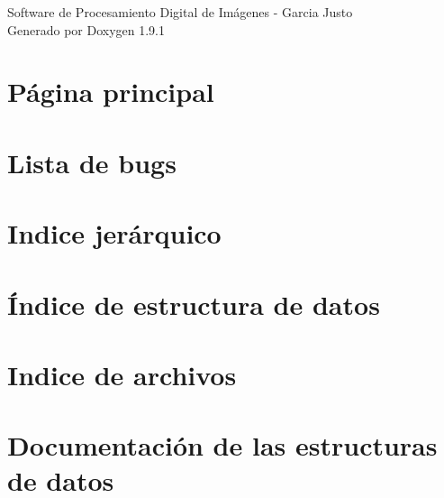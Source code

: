 \let\mypdfximage\pdfximage\def\pdfximage{\immediate\mypdfximage}\documentclass[twoside]{book}
\newcommand{\+}{\discretionary{\mbox{\scriptsize$\hookleftarrow$}}{}{}}
\newcommand{\clearemptydoublepage}{%
  \newpage{\pagestyle{empty}\cleardoublepage}%
}
\begin{document}
\raggedbottom

\hypersetup{pageanchor=false,
             bookmarksnumbered=true,
             pdfencoding=unicode
            }
\begin{titlepage}
\vspace*{7cm}
\begin{center}%
{\Large Software de Procesamiento Digital de Imágenes -\/ Garcia Justo }\\
\vspace*{1cm}
{\large Generado por Doxygen 1.9.1}\\
\end{center}
\end{titlepage}
\clearemptydoublepage
{}
\tableofcontents
\clearemptydoublepage
{}
\hypersetup{pageanchor=true}

\chapter{Página principal}
\label{index}\hypertarget{index}{}
\chapter{Lista de bugs}
\label{bug}

\chapter{Indice jerárquico}

\chapter{Índice de estructura de datos}

\chapter{Indice de archivos}

\chapter{Documentación de las estructuras de datos}

























\end{document}
